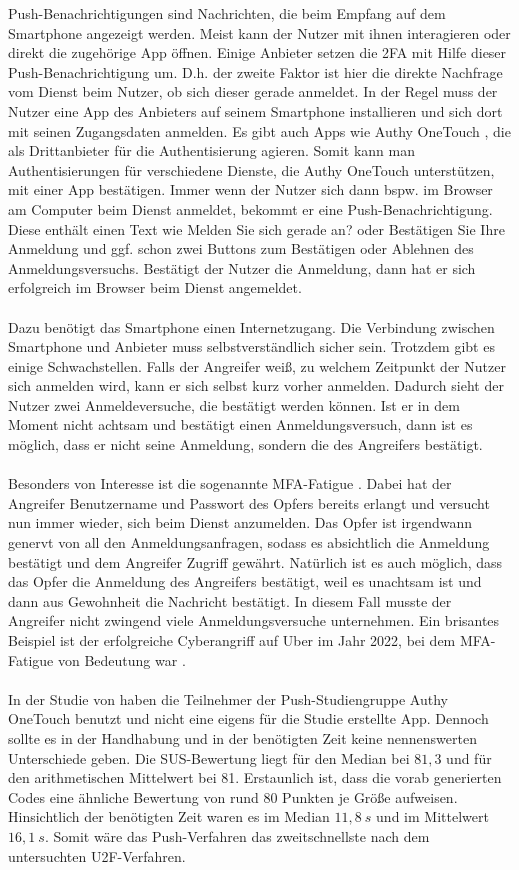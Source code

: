 Push-Benachrichtigungen sind Nachrichten, die beim Empfang auf dem Smartphone 
angezeigt werden. Meist kann der Nutzer mit ihnen interagieren oder direkt die 
zugehörige App öffnen. Einige Anbieter setzen die 2FA mit Hilfe dieser 
Push-Benachrichtigung um. D.h. der zweite Faktor ist hier die direkte Nachfrage vom Dienst beim Nutzer, ob sich dieser gerade anmeldet. In der Regel muss der Nutzer eine App des Anbieters auf 
seinem Smartphone installieren und sich dort mit seinen Zugangsdaten anmelden. Es 
gibt auch Apps wie Authy OneTouch \autocite{authy}, die als Drittanbieter für die 
Authentisierung agieren. Somit kann man Authentisierungen für verschiedene Dienste, 
die Authy OneTouch unterstützen, mit einer App bestätigen. Immer wenn der Nutzer 
sich dann bspw. im Browser am Computer beim Dienst anmeldet, bekommt er eine 
Push-Benachrichtigung. Diese enthält einen Text wie \glqq Melden Sie sich gerade an?\grqq{} 
oder \glqq Bestätigen Sie Ihre Anmeldung\grqq{} und ggf. schon zwei Buttons zum Bestätigen oder 
Ablehnen des Anmeldungsversuchs. Bestätigt der Nutzer die Anmeldung, dann hat er 
sich erfolgreich im Browser beim Dienst angemeldet.
\\\\
Dazu benötigt das Smartphone einen Internetzugang. Die Verbindung zwischen 
Smartphone und Anbieter muss selbstverständlich sicher sein. Trotzdem gibt es einige 
Schwachstellen. Falls der Angreifer weiß, zu welchem Zeitpunkt der Nutzer sich 
anmelden wird, kann er sich selbst kurz vorher anmelden. Dadurch sieht der Nutzer 
zwei Anmeldeversuche, die bestätigt werden können. Ist er in dem Moment nicht 
achtsam und bestätigt einen Anmeldungsversuch, dann ist es möglich, dass er nicht 
seine Anmeldung, sondern die des Angreifers bestätigt. \autocite[16]{Hess}
\\\\
Besonders von Interesse ist die sogenannte MFA-Fatigue \autocite{sosafe}. Dabei hat der Angreifer 
Benutzername und Passwort des Opfers bereits erlangt und versucht nun immer wieder, 
sich beim Dienst anzumelden. Das Opfer ist irgendwann genervt von all den 
Anmeldungsanfragen, sodass es absichtlich die Anmeldung bestätigt und dem Angreifer 
Zugriff gewährt. Natürlich ist es auch möglich, dass das Opfer die Anmeldung des 
Angreifers bestätigt, weil es unachtsam ist und dann aus Gewohnheit die Nachricht 
bestätigt. In diesem Fall musste der Angreifer nicht zwingend viele 
Anmeldungsversuche unternehmen. Ein brisantes Beispiel ist der erfolgreiche 
Cyberangriff auf Uber im Jahr 2022, bei dem MFA-Fatigue von Bedeutung war \autocite{Huckle}.
\\\\
In der Studie von \textcite{Reese} haben die Teilnehmer der Push-Studiengruppe Authy 
OneTouch benutzt und nicht eine eigens für die Studie erstellte App. Dennoch sollte 
es in der Handhabung und in der benötigten Zeit keine nennenswerten Unterschiede 
geben. Die SUS-Bewertung liegt für den Median bei $81{,}3$ und für den arithmetischen 
Mittelwert bei 81. Erstaunlich ist, dass die vorab generierten 
Codes eine ähnliche Bewertung von rund 80 Punkten je Größe aufweisen. Hinsichtlich 
der benötigten Zeit waren es im Median $11{,}8~s$ und im Mittelwert $16{,}1~s$. Somit wäre das Push-Verfahren das zweitschnellste nach dem untersuchten 
U2F-Verfahren.
